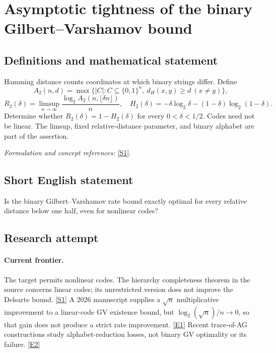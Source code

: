 \documentclass[11pt,a4paper]{article}
\newcommand{\sref}[2]{\hyperlink{source:#1:#2}{[S#2]}}
\newcommand{\eref}[2]{\hyperlink{extra:#1:#2}{[E#2]}}
\newif\ifshowcatalogue
\newcommand{\cataloguescope}[1]{\ifshowcatalogue
 \paragraph{Exact scope in the supplied catalogue.}
 \begin{quote}\small #1\end{quote}\fi}
\numberwithin{equation}{section}
\begin{document}
\setcounter{section}{0}
\clearpage
\section*{\texorpdfstring{Asymptotic tightness of the binary Gilbert–Varshamov bound}{Asymptotic tightness of the binary Gilbert–Varshamov bound}}\label{30006751}
\subsection{Definitions and mathematical statement}
Hamming distance counts coordinates at which binary strings differ. Define
\[
 A_2(n,d)=\max\{|C|:C\subseteq\{0,1\}^n,\ d_H(x,y)\ge d\ (x\ne y)\},
\]
\[
 R_2(\delta)=\limsup_{n\to\infty}\frac{\log_2A_2(n,\lfloor\delta n\rfloor)}n,
 \quad H_2(\delta)=-\delta\log_2\delta-(1-\delta)\log_2(1-\delta).
\]
Determine whether $R_2(\delta)=1-H_2(\delta)$ for every $0<\delta<1/2$. Codes need not be linear. The limsup, fixed relative-distance parameter, and binary alphabet are part of the assertion.
\par\smallskip\textit{Formulation and concept references:} \sref{30006751}{1}.
\cataloguescope{For integers n>=1 and d>=0, let A\_2(n,d) be the maximum cardinality of a binary code C subset \{0,1\}\textasciicircum{}n, not necessarily linear, with Hamming distance at least d between distinct codewords. For each fixed real 0<delta<1/2 define R\_2(delta)=limsup\_\{n->infinity\} n\textasciicircum{}(-1) log\_2 A\_2(n,floor(delta n)) and H\_2(delta)=-delta log\_2(delta)-(1-delta)log\_2(1-delta). Is R\_2(delta)=1-H\_2(delta) for every such delta?}
\subsection{Short English statement}
Is the binary Gilbert--Varshamov rate bound exactly optimal for every relative distance below one half, even for nonlinear codes?
\subsection{Research attempt}

\paragraph{Current frontier.}
The target permits nonlinear codes. The hierarchy completeness theorem in
the source concerns linear codes; its unrestricted version does not improve
the Delsarte bound. \sref{30006751}{1} A 2026 manuscript supplies a $\sqrt n$
multiplicative improvement to a linear-code GV existence bound, but
$\log_2(\sqrt n)/n\to0$, so that gain does not produce a strict rate
improvement. \eref{30006751}{1} Recent trace-of-AG constructions study
alphabet-reduction losses, not binary GV optimality or its failure.
\eref{30006751}{2}
\end{document}
